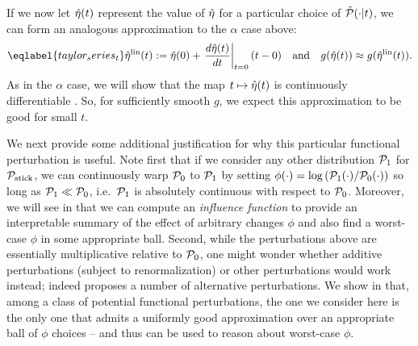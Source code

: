 If we now let $\hat\eta(t)$ represent the value of $\hat\eta$ for a particular
choice of $\tilde{\mathcal{P}}(\cdot \vert t)$, we can form an analogous approximation to the
$\alpha$ case above:
%
\begin{align} \eqlabel{taylor_series_t}
%
\etalin(\t) :=
    \etaopt(0) +
    \fracat{d\etaopt(t)}{dt}{\t=0} (\t - 0)
\mathand
g(\etaopt(\t)) \approx g(\etalin(\t)).
%
\end{align}
%
As in the $\alpha$ case, we will show that the map $t \mapsto \hat\eta(t)$ is
continuously differentiable . So, for sufficiently smooth $g$, we expect this
approximation to be good for small $t$.

We next provide some additional justification for why this particular functional
perturbation is useful. Note first that if we consider any other distribution
$\mathcal{P}_{1}$ for $\mathcal{P}_{\mathrm{stick}}$, we can continuously warp $\mathcal{P}_{0}$ to $\mathcal{P}_{1}$ by setting
$\phi(\cdot) = \log \left( \mathcal{P}_{1}(\cdot) / \mathcal{P}_{0}(\cdot) \right)$ so long as
$\mathcal{P}_{1} \ll \mathcal{P}_{0}$, i.e.\ $\mathcal{P}_{1}$ is absolutely continuous with respect to
$\mathcal{P}_{0}$. Moreover, we will see in  that we can
compute an \emph{influence function} to provide an interpretable summary of the
effect of arbitrary changes $\phi$ and also find a worst-case $\phi$ in some
appropriate ball. Second, while the perturbations above are essentially
multiplicative relative to $\mathcal{P}_{0}$, one might wonder whether additive
perturbations (subject to renormalization) or other perturbations would work
instead; indeed \citet{gustafson:1996:local} proposes a number of alternative
perturbations. We show in  that, among a class of
potential functional perturbations, the one we consider here is the only one
that admits a uniformly good approximation over an appropriate ball of $\phi$
choices -- and thus can be used to reason about worst-case $\phi$.


